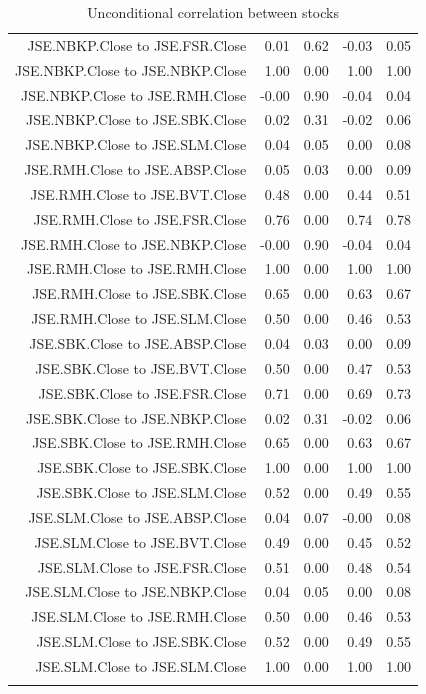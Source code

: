 \documentclass[11pt,preprint, authoryear]{elsarticle}
\numberwithin{equation}{section}
\numberwithin{figure}{section}
\numberwithin{table}{section}
\begin{document}
\begin{longtable}{rrrrr}
  JSE.NBKP.Close to JSE.FSR.Close & 0.01 & 0.62 & -0.03 & 0.05 \\ 
  JSE.NBKP.Close to JSE.NBKP.Close & 1.00 & 0.00 & 1.00 & 1.00 \\ 
  JSE.NBKP.Close to JSE.RMH.Close & -0.00 & 0.90 & -0.04 & 0.04 \\ 
  JSE.NBKP.Close to JSE.SBK.Close & 0.02 & 0.31 & -0.02 & 0.06 \\ 
  JSE.NBKP.Close to JSE.SLM.Close & 0.04 & 0.05 & 0.00 & 0.08 \\ 
  JSE.RMH.Close to JSE.ABSP.Close & 0.05 & 0.03 & 0.00 & 0.09 \\ 
  JSE.RMH.Close to JSE.BVT.Close & 0.48 & 0.00 & 0.44 & 0.51 \\ 
  JSE.RMH.Close to JSE.FSR.Close & 0.76 & 0.00 & 0.74 & 0.78 \\ 
  JSE.RMH.Close to JSE.NBKP.Close & -0.00 & 0.90 & -0.04 & 0.04 \\ 
  JSE.RMH.Close to JSE.RMH.Close & 1.00 & 0.00 & 1.00 & 1.00 \\ 
  JSE.RMH.Close to JSE.SBK.Close & 0.65 & 0.00 & 0.63 & 0.67 \\ 
  JSE.RMH.Close to JSE.SLM.Close & 0.50 & 0.00 & 0.46 & 0.53 \\ 
  JSE.SBK.Close to JSE.ABSP.Close & 0.04 & 0.03 & 0.00 & 0.09 \\ 
  JSE.SBK.Close to JSE.BVT.Close & 0.50 & 0.00 & 0.47 & 0.53 \\ 
  JSE.SBK.Close to JSE.FSR.Close & 0.71 & 0.00 & 0.69 & 0.73 \\ 
  JSE.SBK.Close to JSE.NBKP.Close & 0.02 & 0.31 & -0.02 & 0.06 \\ 
  JSE.SBK.Close to JSE.RMH.Close & 0.65 & 0.00 & 0.63 & 0.67 \\ 
  JSE.SBK.Close to JSE.SBK.Close & 1.00 & 0.00 & 1.00 & 1.00 \\ 
  JSE.SBK.Close to JSE.SLM.Close & 0.52 & 0.00 & 0.49 & 0.55 \\ 
  JSE.SLM.Close to JSE.ABSP.Close & 0.04 & 0.07 & -0.00 & 0.08 \\ 
  JSE.SLM.Close to JSE.BVT.Close & 0.49 & 0.00 & 0.45 & 0.52 \\ 
  JSE.SLM.Close to JSE.FSR.Close & 0.51 & 0.00 & 0.48 & 0.54 \\ 
  JSE.SLM.Close to JSE.NBKP.Close & 0.04 & 0.05 & 0.00 & 0.08 \\ 
  JSE.SLM.Close to JSE.RMH.Close & 0.50 & 0.00 & 0.46 & 0.53 \\ 
  JSE.SLM.Close to JSE.SBK.Close & 0.52 & 0.00 & 0.49 & 0.55 \\ 
  JSE.SLM.Close to JSE.SLM.Close & 1.00 & 0.00 & 1.00 & 1.00 \\ 
   \bottomrule
\caption{Unconditional correlation between stocks \label{tab2}} 
\end{longtable}
\end{document}
